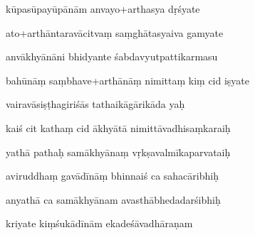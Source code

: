 \documentclass[article,12pt,a4paper]{memoir}%
\newcounter{parCount}
\begin{document}
	  
	  \pstart {} kūpasūpayūpānām anvayo+arthasya dṛśyate 
	{}
	\pend%
      

	  
	  \pstart \leavevmode%
	ato+arthāntaravācitvaṃ saṃghātasyaiva gamyate 
	{}
	\pend%
      

	  
	  \pstart {} anvākhyānāni bhidyante śabdavyutpattikarmasu 
	{}
	\pend%
      

	  
	  \pstart \leavevmode%
	bahūnāṃ saṃbhave+arthānāṃ nimittaṃ kiṃ cid iṣyate 
	{}
	\pend%
      

	  
	  \pstart {} vairavāsiṣṭhagiriśās tathaikāgārikāda yaḥ 
	{}
	\pend%
      

	  
	  \pstart \leavevmode%
	kaiś cit kathaṃ cid ākhyātā nimittāvadhisaṃkaraiḥ 
	{}
	\pend%
      

	  
	  \pstart {} yathā pathaḥ samākhyānaṃ vṛkṣavalmīkaparvataiḥ 
	{}
	\pend%
      

	  
	  \pstart \leavevmode%
	aviruddhaṃ gavādīnāṃ bhinnaiś ca sahacāribhiḥ 
	{}
	\pend%
      

	  
	  \pstart {} anyathā ca samākhyānam avasthābhedadarśibhiḥ 
	{}
	\pend%
      

	  
	  \pstart \leavevmode%
	kriyate kiṃśukādīnām ekadeśāvadhāraṇam 
	{}
	\pend%
      
\end{document}
